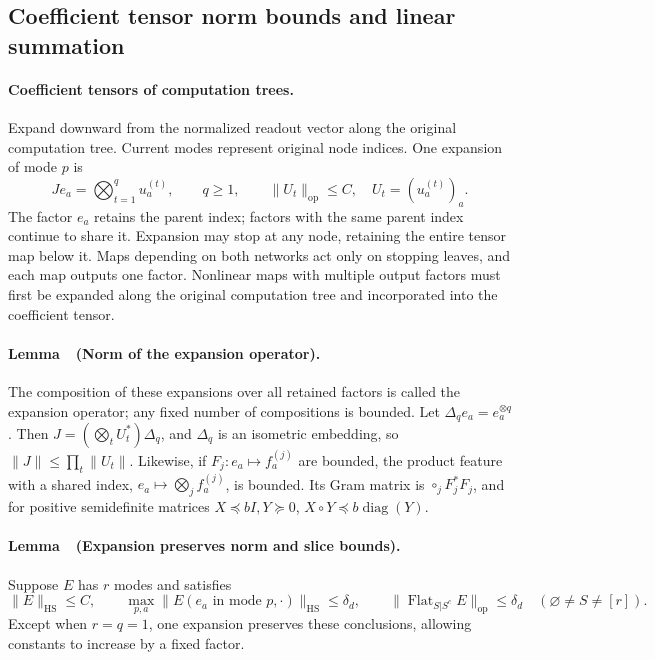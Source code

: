 \documentclass[a4paper]{tufte-handout}
\begin{document}
\begin{fullwidth}
\subsection{Coefficient tensor norm bounds and linear summation}
\label{fp:core-invariant-section}

\paragraph{Coefficient tensors of computation trees.}
Expand downward from the normalized readout vector along the original computation tree.
Current modes represent original node indices. One expansion of mode $p$ is
\begin{equation}
 J e_a=\bigotimes_{t=1}^{q}u_a^{(t)},\qquad q\geq1,
 \qquad \|U_t\|_{\mathrm{op}}\leq C,
 \quad U_t=(u_a^{(t)})_a .
 \label{fp:core-replacement}
\end{equation}
The factor $e_a$ retains the parent index; factors with the same parent index continue to share it. Expansion may stop at any node, retaining the entire tensor map below it.
Maps depending on both networks act only on stopping leaves, and each map outputs one factor. Nonlinear maps with multiple output factors must first be expanded along the original computation tree and incorporated into the coefficient tensor.

\paragraph{Lemma~\thelemma\ (Norm of the expansion operator).}
The composition of these expansions over all retained factors is called the expansion operator; any fixed number of compositions is bounded. Let
$\Delta_q e_a=e_a^{\otimes q}$. Then
$J=(\bigotimes_tU_t^*)\Delta_q$, and $\Delta_q$ is an isometric embedding, so
$\|J\|\leq\prod_t\|U_t\|$.
Likewise, if $F_j:e_a\mapsto f_a^{(j)}$ are bounded, the product feature with a shared index,
$e_a\mapsto\bigotimes_jf_a^{(j)}$, is bounded.
Its Gram matrix is $\mathop{\circ}_jF_j^*F_j$,
and for positive semidefinite matrices $X\preceq bI,Y\succeq0$,
$X\circ Y\preceq b\operatorname{diag}(Y)$.

\paragraph{Lemma~\thelemma\ (Expansion preserves norm and slice bounds).}
\label{fp:core-closure}
Suppose $E$ has $r$ modes and satisfies
\begin{equation}
 \|E\|_{\mathrm{HS}}\leq C,\qquad
 \max_{p,a}\|E(e_a\text{ in mode }p,\cdot)\|_{\mathrm{HS}}\leq\delta_d,
 \qquad
 \|\operatorname{Flat}_{S|S^c}E\|_{\mathrm{op}}\leq\delta_d
 \quad(\varnothing\ne S\ne[r]).
 \label{fp:core-invariants}
\end{equation}
Except when $r=q=1$, one expansion preserves these conclusions, allowing constants to increase by a fixed factor.


\end{fullwidth}
\end{document}
